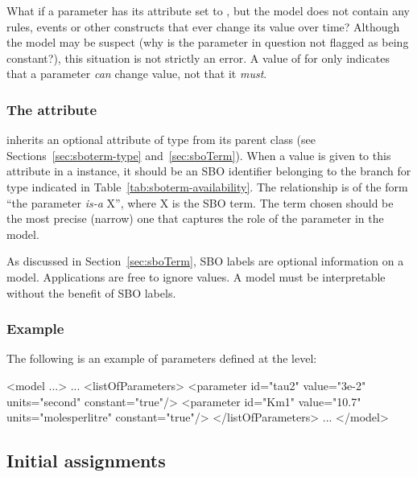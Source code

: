What if a parameter has its  attribute set to
, but the model does not contain any rules, events or
other constructs that ever change its value over time?  Although
the model may be suspect (why is the parameter in question not
flagged as being constant?), this situation is not strictly an
error.  A value of  for  only indicates
that a parameter \emph{can} change value, not that it \emph{must}.


\subsubsection{The  attribute}
\label{sec:parameter-sboterm}

\Parameter inherits an optional 
attribute of type  from its parent
class \SBase (see Sections~\ref{sec:sboterm-type}
and~\ref{sec:sboTerm}).  When a value is given to this
attribute in a \Parameter instance, it should be an
SBO identifier belonging to the branch for type \Parameter 
indicated in Table~\ref{tab:sboterm-availability}.  The relationship is
of the form ``the parameter \emph{is-a} X'', where X is
the SBO term.  The term chosen should be the most precise (narrow)
one that captures the role of the parameter in the model.

As discussed in Section~\ref{sec:sboTerm}, SBO labels are optional
information on a model.  Applications are free to ignore
 values.  A model must be interpretable without the
benefit of SBO labels.


\subsubsection{Example}

The following is an example of parameters defined at the \Model level:

\begin{example}
<model ...>
    ...
    <listOfParameters>
        <parameter id="tau2" value="3e-2" units="second" constant="true"/>
        <parameter id="Km1" value="10.7" units="molesperlitre" constant="true"/>
    </listOfParameters>
    ...
</model>
\end{example}


\subsection{Initial assignments}
\label{sec:initialAssignment}

